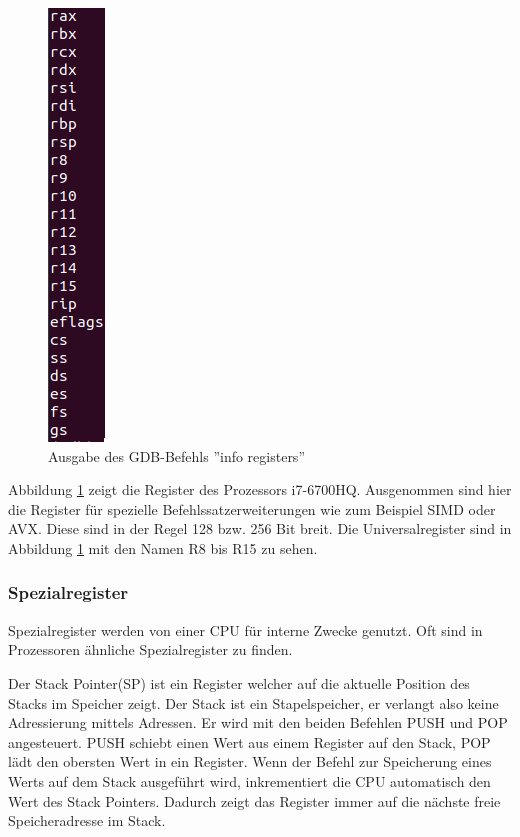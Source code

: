 \documentclass[12pt]{article}
\begin{document}


\begin{figure}
\centering
\includegraphics[scale=0.5]{inforeg}
\centering
\caption{Ausgabe des GDB-Befehls ''info registers''}
\label{fig:inforeg}
\end{figure}

\noindent Abbildung \ref{fig:inforeg} zeigt die Register des Prozessors i7-6700HQ. Ausgenommen sind hier die Register für spezielle Befehlssatzerweiterungen wie zum Beispiel SIMD oder AVX. Diese sind in der Regel 128 bzw. 256 Bit breit. Die Universalregister sind in Abbildung \ref{fig:inforeg} mit den Namen R8 bis R15 zu sehen.
\subsubsection{Spezialregister}
Spezialregister werden von einer CPU für interne Zwecke genutzt. Oft sind in Prozessoren ähnliche Spezialregister zu finden. 

\par \bigskip
\noindent Der Stack Pointer(SP) ist ein Register welcher auf die aktuelle Position des Stacks im Speicher zeigt. Der Stack ist ein Stapelspeicher, er verlangt also keine Adressierung mittels Adressen. Er wird mit den beiden Befehlen PUSH und POP angesteuert. PUSH schiebt einen Wert aus einem Register auf den Stack, POP lädt den obersten Wert in ein Register.  Wenn der Befehl zur Speicherung eines Werts auf dem Stack ausgeführt wird, inkrementiert die CPU automatisch den Wert des Stack Pointers. Dadurch zeigt das Register immer auf die nächste freie Speicheradresse im Stack.
\end{document}
